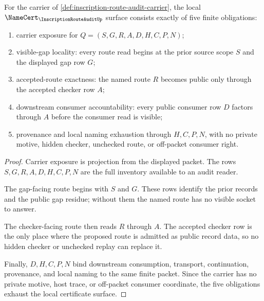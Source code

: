 \begin{theorem}
\label{thm:inscription-route-audit-namecert-obligations}
For the carrier of \autoref{def:inscription-route-audit-carrier}, the local
$\NameCert_{\InscriptionRouteAuditUp}$ surface consists exactly of five finite
obligations:
\begin{enumerate}
\item carrier exposure for $Q=(S,G,R,A,D,H,C,P,N)$;
\item visible-gap locality: every route read begins at the prior source scope $S$ and the displayed gap row $G$;
\item accepted-route exactness: the named route $R$ becomes public only through the accepted checker row $A$;
\item downstream consumer accountability: every public consumer row $D$ factors through $A$ before the consumer read is visible;
\item provenance and local naming exhaustion through $H,C,P,N$, with no private motive, hidden checker, unchecked route, or off-packet consumer right.
\end{enumerate}
\end{theorem}
\begin{proof}
Carrier exposure is projection from the displayed packet. The rows
$S,G,R,A,D,H,C,P,N$ are the full inventory available to an audit reader.

The gap-facing route begins with $S$ and $G$. These rows identify the prior
records and the public gap residue; without them the named route has no
visible socket to answer.

The checker-facing route then reads $R$ through $A$. The accepted checker row
is the only place where the proposed route is admitted as public record data,
so no hidden checker or unchecked replay can replace it.

Finally, $D,H,C,P,N$ bind downstream consumption, transport, continuation,
provenance, and local naming to the same finite packet. Since the carrier has
no private motive, host trace, or off-packet consumer coordinate, the five
obligations exhaust the local certificate surface.
\end{proof}


